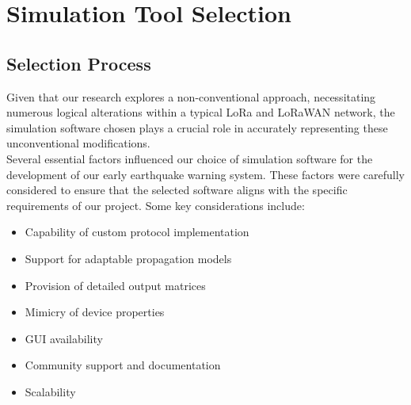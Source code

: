 \section{Simulation Tool Selection}\label{ch:simulation}

\subsection{Selection Process}
\label{sec:simulation-selection}
\hspace{12pt} Given that our research explores a non-conventional approach, necessitating numerous logical alterations within a typical LoRa and LoRaWAN network, the simulation software chosen plays a crucial role in accurately representing these unconventional modifications.\\

Several essential factors influenced our choice of simulation software for the development of our early earthquake warning system. These factors were carefully considered to ensure that the selected software aligns with the specific requirements of our project. Some key considerations include: 
\begin{itemize}
    \item Capability of custom protocol implementation
    \item Support for adaptable propagation models
    \item Provision of detailed output matrices
    \item Mimicry of device properties
    \item GUI availability
    \item Community support and documentation
    \item Scalability
\end{itemize}

